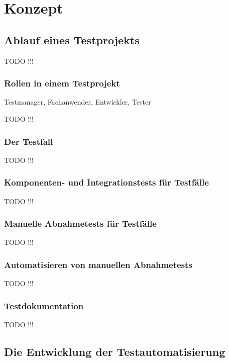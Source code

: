 \chapter{Konzept}
\label{cha:Konzept}

\section{Ablauf eines Testprojekts}

TODO !!!

\subsection{Rollen in einem Testprojekt}

Testmanager, Fachanwender, Entwickler, Tester

TODO !!!

\subsection{Der Testfall}

TODO !!!

\subsection{Komponenten- und Integrationstests für Testfälle}

TODO !!!

\subsection{Manuelle Abnahmetests für Testfälle}

TODO !!!

\subsection{Automatisieren von manuellen Abnahmetests}

TODO !!!

\subsection{Testdokumentation}

TODO !!!

\section{Die Entwicklung der Testautomatisierung}

